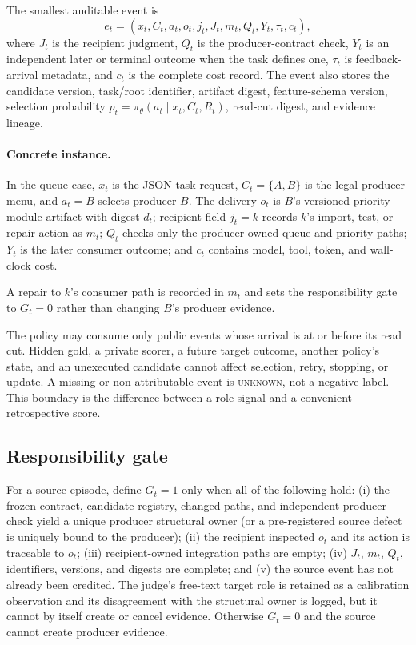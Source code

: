 \documentclass[sigconf,anonymous]{aamas}
\newcommand{\unknown}{\textsc{unknown}}
\begin{document}
The smallest auditable event is
\begin{equation}
 e_t=(x_t,C_t,a_t,o_t,j_t,J_t,m_t,Q_t,Y_t,\tau_t,c_t),
 \label{eq:event}
\end{equation}
where $J_t$ is the recipient judgment, $Q_t$ is the producer-contract check, $Y_t$ is an independent later or terminal outcome when the task defines one, $\tau_t$ is feedback-arrival metadata, and $c_t$ is the complete cost record. The event also stores the candidate version, task/root identifier, artifact digest, feature-schema version, selection probability $p_t=\pi_\theta(a_t\mid x_t,C_t,R_t)$, read-cut digest, and evidence lineage.

\paragraph{Concrete instance.} In the queue case, $x_t$ is the JSON task request, $C_t=\{A,B\}$ is the legal producer menu, and $a_t=B$ selects producer $B$. The delivery $o_t$ is $B$'s versioned priority-module artifact with digest $d_t$; recipient field $j_t=k$ records $k$'s import, test, or repair action as $m_t$; $Q_t$ checks only the producer-owned queue and priority paths; $Y_t$ is the later consumer outcome; and $c_t$ contains model, tool, token, and wall-clock cost.

A repair to $k$'s consumer path is recorded in $m_t$ and sets the responsibility gate to $G_t=0$ rather than changing $B$'s producer evidence.

The policy may consume only public events whose arrival is at or before its read cut. Hidden gold, a private scorer, a future target outcome, another policy's state, and an unexecuted candidate cannot affect selection, retry, stopping, or update. A missing or non-attributable event is \unknown{}, not a negative label. This boundary is the difference between a role signal and a convenient retrospective score.

\subsection{Responsibility gate}
For a source episode, define $G_t=1$ only when all of the following hold: (i) the frozen contract, candidate registry, changed paths, and independent producer check yield a unique producer structural owner (or a pre-registered source defect is uniquely bound to the producer); (ii) the recipient inspected $o_t$ and its action is traceable to $o_t$; (iii) recipient-owned integration paths are empty; (iv) $J_t$, $m_t$, $Q_t$, identifiers, versions, and digests are complete; and (v) the source event has not already been credited. The judge's free-text target role is retained as a calibration observation and its disagreement with the structural owner is logged, but it cannot by itself create or cancel evidence. Otherwise $G_t=0$ and the source cannot create producer evidence.
\end{document}
